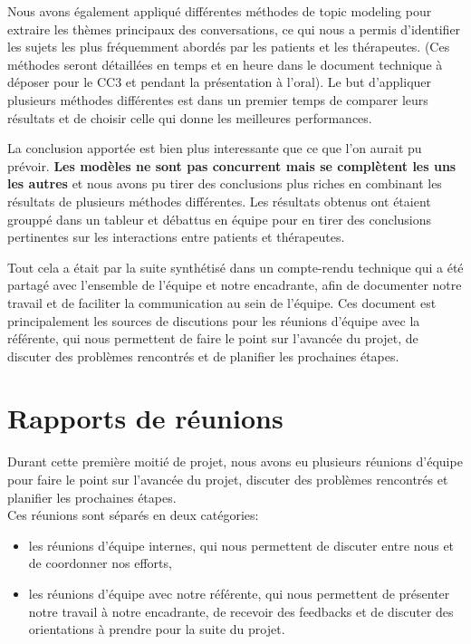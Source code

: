 \documentclass[12pt,a4paper]{article}
\begin{document}
Nous avons également appliqué différentes méthodes de topic modeling pour extraire les thèmes principaux des conversations,
ce qui nous a permis d'identifier les sujets les plus fréquemment abordés par les patients et les thérapeutes. 
(Ces méthodes seront détaillées en temps et en heure dans le document technique à déposer pour le CC3 et pendant la présentation à l'oral).
Le but d'appliquer plusieurs méthodes différentes est dans un premier temps de comparer leurs résultats et de choisir celle qui donne les meilleures performances.\smallbreak

La conclusion apportée est bien plus interessante que ce que l'on aurait pu prévoir.
\textbf{Les modèles ne sont pas concurrent mais se complètent les uns les autres} et nous avons pu tirer des conclusions plus riches en combinant les résultats de plusieurs méthodes différentes. 
Les résultats obtenus ont étaient grouppé dans un tableur et débattus en équipe pour en tirer des conclusions pertinentes sur les interactions entre patients et thérapeutes.\smallbreak

Tout cela a était par la suite synthétisé dans un compte-rendu technique qui a été partagé avec l'ensemble de l'équipe et notre encadrante, 
afin de documenter notre travail et de faciliter la communication au sein de l'équipe.
Ces document est principalement les sources de discutions pour les réunions d'équipe avec la référente, 
qui nous permettent de faire le point sur l'avancée du projet, 
de discuter des problèmes rencontrés et de planifier les prochaines étapes.

\pagebreak
\section{Rapports de réunions}
Durant cette première moitié de projet, nous avons eu plusieurs réunions d'équipe pour faire le point sur l'avancée du projet, 
discuter des problèmes rencontrés et planifier les prochaines étapes.\\
Ces réunions sont séparés en deux catégories:
\begin{itemize}
  \item[1.] les réunions d'équipe internes, qui nous permettent de discuter entre nous et de coordonner nos efforts,
  \item[2.] les réunions d'équipe avec notre référente, qui nous permettent de présenter notre travail à notre encadrante, 
  de recevoir des feedbacks et de discuter des orientations à prendre pour la suite du projet.
\end{itemize}
\end{document}
